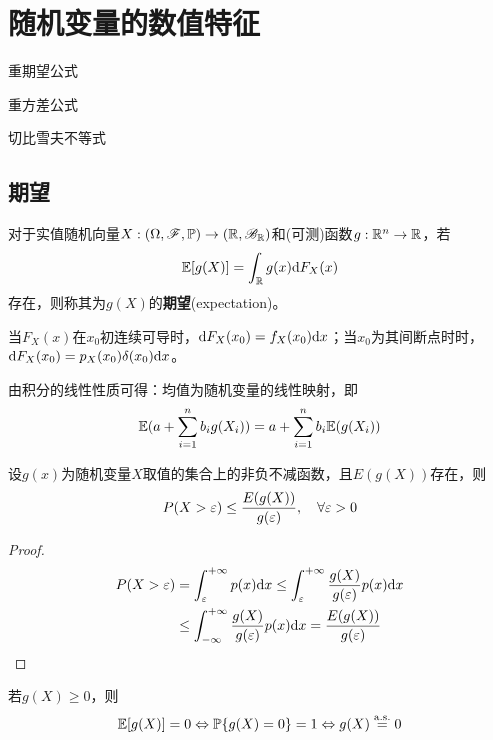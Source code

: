 \chapter{随机变量的数值特征}
\begin{introduction}[考试重点]
    \item 重期望公式
    \item 重方差公式
    \item 切比雪夫不等式
\end{introduction}
\section{期望}

\begin{definition}[期望]
    对于实值随机向量$X : (\Omega,\mathscr{F},\mathbb{P}) \to (\mathbb{R},\mathscr{B}_{\mathbb{R}})$和(可测)函数$g : \mathbb{R}^n \to \mathbb{R}$，若
    \[ \mathbb{E}[g(X)] = \int_{\mathbb{R}} g(x) \mathrm{d} F_X(x) \]
    存在，则称其为$g(X)$的\textbf{期望}(expectation)。
\end{definition}

\begin{remark}
    当$F_X(x)$在$x_0$初连续可导时，$\mathrm{d} F_X(x_0)=f_X(x_0)\mathrm{d} x$；当$x_0$为其间断点时时，$\mathrm{d} F_X(x_0)=p_X(x_0)\delta(x_0)\mathrm{d} x$。
\end{remark}


\begin{proposition}[期望的线性性质]
    由积分的线性性质可得：均值为随机变量的线性映射，即
    \[ \mathbb{E}(a+\sum_{i=1}^n b_i g(X_i))=a+\sum_{i=1}^n b_i \mathbb{E}(g(X_i)) \]
\end{proposition}

\begin{theorem}[Markov不等式]
    设$g(x)$为随机变量$X$取值的集合上的非负不减函数，且$E(g(X))$存在，则
    \[ P(X>\varepsilon) \leq \frac{E(g(X))}{g(\varepsilon)} ,\quad \forall \varepsilon > 0\]
\end{theorem}
\begin{proof}
    \begin{align*}
        P(X>\varepsilon) & =\int_{\varepsilon}^{+\infty}p(x) \mathrm{d} x \leq \int_{\varepsilon}^{+\infty}\frac{g(X)}{g(\varepsilon)}p(x) \mathrm{d} x \\
                & \leq \int_{-\infty}^{+\infty}\frac{g(X)}{g(\varepsilon)}p(x) \mathrm{d} x = \frac{E(g(X))}{g(\varepsilon)}
    \end{align*}
\end{proof}

\begin{corollary}
    若$g(X) \ge 0$，则
    \[ \mathbb{E}[g(X)] = 0 \Leftrightarrow  \mathbb{P}\{g(X)=0\} = 1 \Leftrightarrow g(X) \overset{\mathrm{a.s.}}{=} 0 \]
\end{corollary}

